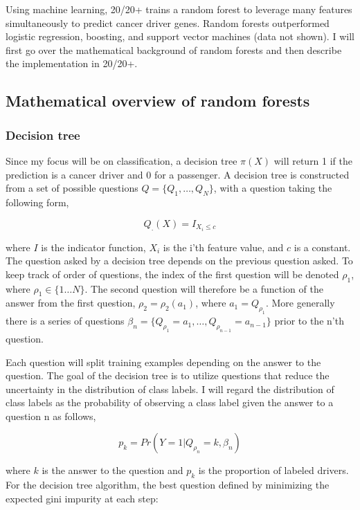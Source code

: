Using machine learning, 20/20+ trains a random forest to leverage many features simultaneously to predict cancer driver genes. Random forests outperformed logistic regression, boosting, and support vector machines (data not shown). I will first go over the mathematical background of random forests and then describe the implementation in 20/20+.

\subsection{Mathematical overview of random forests}

\subsubsection{Decision tree}

Since my focus will be on classification, a decision tree $\pi(X)$ will return 1 if the prediction is a cancer driver and 0 for a passenger. A decision tree is constructed from a set of possible questions $Q=\{Q_1,\ldots,Q_N\}$, with a question taking the following form,

\begin{equation}
Q_.(X)=I_{X_i \leq c}
\end{equation}

where $I$ is the indicator function, $X_i$ is the i'th feature value, and $c$ is a constant. The question asked by a decision tree depends on the previous question asked. To keep track of order of questions, the index of the first question will be denoted $\rho_1$, where $\rho_1\in\{1\ldots N\}$. The second question will therefore be a function of the answer from the first question, $\rho_2=\rho_2(a_1)$, where $a_1=Q_{\rho_1}$. More generally there is a series of questions $\beta_n=\{Q_{\rho_1}=a_1,\ldots,Q_{\rho_{n-1}}=a_{n-1}\}$ prior to the n'th question.

Each question will split training examples depending on the answer to the question. The goal of the decision tree is to utilize questions that reduce the uncertainty in the distribution of class labels. I will regard the distribution of class labels as the probability of observing a class label given the answer to a question n as follows,

\begin{equation}
p_k=Pr⁡(Y=1|Q_{ρ_n}=k,\beta_n)
\end{equation}

where $k$ is the answer to the question and $p_k$ is the proportion of labeled drivers. For the decision tree algorithm, the best question defined by minimizing the expected gini impurity at each step:

